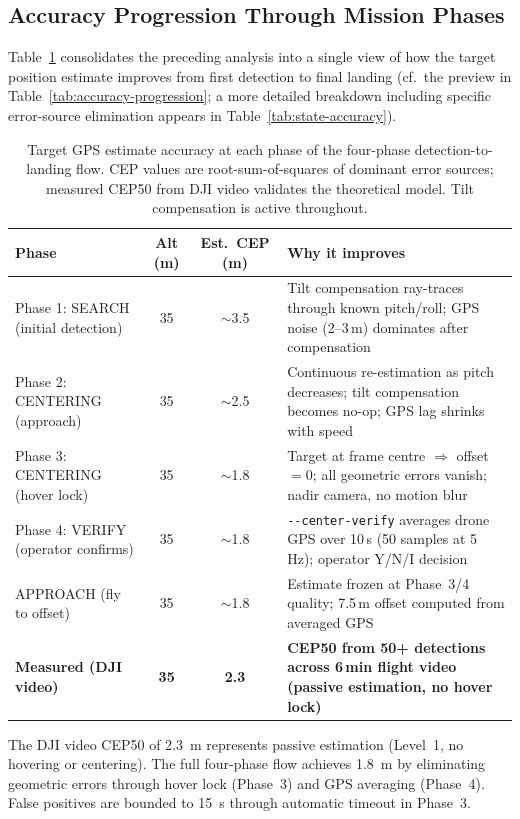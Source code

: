 \subsection{Accuracy Progression Through Mission Phases}\label{sec:accuracy-progression}

Table~\ref{tab:accuracy-journey} consolidates the preceding analysis into a single view of how the target position estimate improves from first detection to final landing (cf.\ the preview in Table~\ref{tab:accuracy-progression}; a more detailed breakdown including specific error-source elimination appears in Table~\ref{tab:state-accuracy}).

\begin{table}[H]
\centering
\caption{Target GPS estimate accuracy at each phase of the four-phase detection-to-landing flow.  CEP values are root-sum-of-squares of dominant error sources; measured CEP50 from DJI video validates the theoretical model.  Tilt compensation is active throughout.}
\label{tab:accuracy-journey}
\small
\begin{tabularx}{\linewidth}{@{}lccX@{}}
\toprule
\textbf{Phase} & \textbf{Alt (m)} & \textbf{Est.\ CEP (m)} & \textbf{Why it improves} \\
\midrule
Phase 1: SEARCH (initial detection) & 35 & $\sim$3.5 & Tilt compensation ray-traces through known pitch/roll; GPS noise (2--3\,m) dominates after compensation \\
Phase 2: CENTERING (approach) & 35 & $\sim$2.5 & Continuous re-estimation as pitch decreases; tilt compensation becomes no-op; GPS lag shrinks with speed \\
Phase 3: CENTERING (hover lock) & 35 & $\sim$1.8 & Target at frame centre $\Rightarrow$ offset $=0$; all geometric errors vanish; nadir camera, no motion blur \\
Phase 4: VERIFY (operator confirms) & 35 & $\sim$1.8 & \texttt{-{}-center-verify} averages drone GPS over 10\,s (50 samples at 5\,Hz); operator Y/N/I decision \\
APPROACH (fly to offset) & 35 & $\sim$1.8 & Estimate frozen at Phase~3/4 quality; 7.5\,m offset computed from averaged GPS \\
\midrule
\textbf{Measured (DJI video)} & \textbf{35} & \textbf{2.3} & \textbf{CEP50 from 50+ detections across 6\,min flight video (passive estimation, no hover lock)} \\
\bottomrule
\end{tabularx}
\par\vspace{2pt}
{\footnotesize The DJI video CEP50 of \SI{2.3}{\metre} represents passive estimation (Level~1, no hovering or centering).  The full four-phase flow achieves \SI{1.8}{\metre} by eliminating geometric errors through hover lock (Phase~3) and GPS averaging (Phase~4).  False positives are bounded to \SI{15}{\second} through automatic timeout in Phase~3.}
\end{table}

